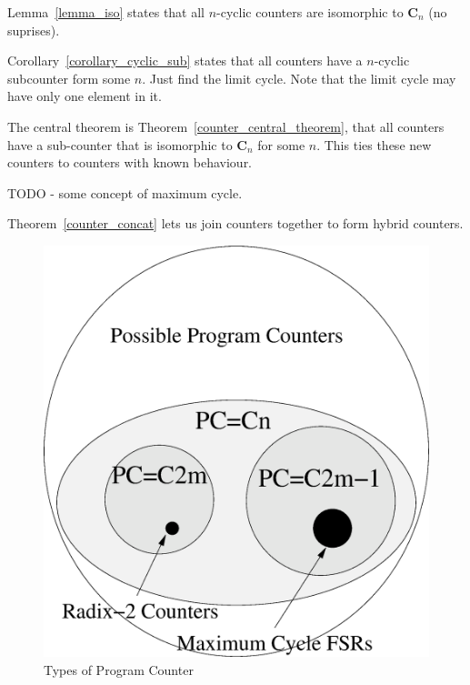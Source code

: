 \documentclass[5p, twocolumn]{elsarticle}
\begin{document}
Lemma~\ref{lemma_iso} states that all $n$-cyclic counters are isomorphic to $\mathbf{C}_n$ (no suprises).

Corollary~\ref{corollary_cyclic_sub} states that all counters have a $n$-cyclic subcounter form some $n$. Just find the limit cycle. Note that the limit cycle may have only one element in it.

The central theorem is Theorem~\ref{counter_central_theorem}, that all counters have a sub-counter that is isomorphic to $\mathbf{C}_n$ for some $n$. This ties these new counters to counters with known behaviour.

TODO - some concept of maximum cycle.

Theorem~\ref{counter_concat} lets us join counters together to form hybrid counters.

\begin{figure}
\begin{center}
\includegraphics[width=\linewidth]{images/program_counter_venn.eps}
\caption{Types of Program Counter}
\label{isomorphism}
\end{center}
\end{figure}
\end{document}

